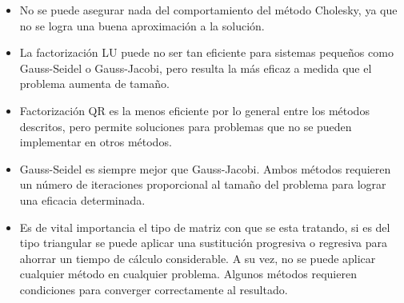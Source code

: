 \documentclass{memoria}
\begin{document}
\begin{itemize}
    \item No se puede asegurar nada del comportamiento del método Cholesky, ya que no se logra una buena aproximación a la solución. 
    \item La factorización LU puede no ser tan eficiente para sistemas pequeños como Gauss-Seidel o Gauss-Jacobi, pero resulta la más eficaz a medida que el problema aumenta de tamaño. 
    \item Factorización QR es la menos eficiente por lo general entre los métodos descritos, pero permite soluciones para problemas que no se pueden implementar en otros métodos.
    \item Gauss-Seidel es siempre mejor que Gauss-Jacobi. Ambos métodos requieren un número de iteraciones proporcional al tamaño del problema para lograr una eficacia determinada.
    \item Es de vital importancia el tipo de matriz con que se esta tratando, si es del tipo triangular se puede aplicar una sustitución progresiva o regresiva para ahorrar un tiempo de cálculo considerable. A su vez, no se puede aplicar cualquier método en cualquier problema. Algunos métodos requieren condiciones para converger correctamente al resultado.
\end{itemize}




\end{document}
